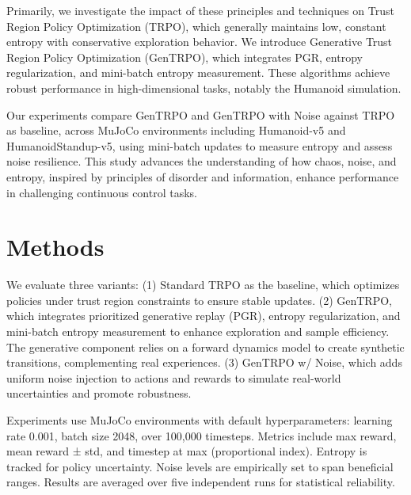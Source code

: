 \documentclass{svproc}
\begin{document}
Primarily, we investigate the impact of these principles and techniques on Trust Region Policy Optimization (TRPO), which generally maintains low, constant entropy with conservative exploration behavior. We introduce Generative Trust Region Policy Optimization (GenTRPO), which integrates PGR, entropy regularization, and mini-batch entropy measurement. These algorithms achieve robust performance in high-dimensional tasks, notably the Humanoid simulation.

Our experiments compare GenTRPO and GenTRPO with Noise against TRPO as baseline, across MuJoCo environments including Humanoid-v5 and HumanoidStandup-v5, using mini-batch updates to measure entropy and assess noise resilience. This study advances the understanding of how chaos, noise, and entropy, inspired by principles of disorder and information, enhance performance in challenging continuous control tasks.

\section{Methods}
We evaluate three variants: (1) Standard TRPO as the baseline, which optimizes policies under trust region constraints to ensure stable updates. (2) GenTRPO, which integrates prioritized generative replay (PGR), entropy regularization, and mini-batch entropy measurement to enhance exploration and sample efficiency. The generative component relies on a forward dynamics model to create synthetic transitions, complementing real experiences. (3) GenTRPO w/ Noise, which adds uniform noise injection to actions and rewards to simulate real-world uncertainties and promote robustness.

Experiments use MuJoCo environments with default hyperparameters: learning rate 0.001, batch size 2048, over 100,000 timesteps. Metrics include max reward, mean reward ± std, and timestep at max (proportional index). Entropy is tracked for policy uncertainty. Noise levels are empirically set to span beneficial ranges. Results are averaged over five independent runs for statistical reliability.
\end{document}

